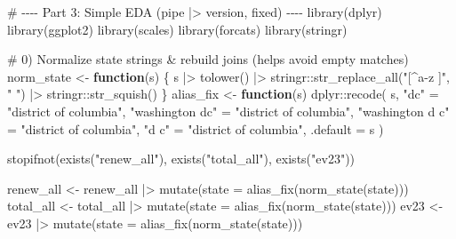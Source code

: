 \documentclass[
  english,
  letterpaper,
  DIV=11,
  numbers=noendperiod]{scrartcl}
\newenvironment{Shaded}{\begin{snugshade}}{\end{snugshade}}
\newcommand{\AttributeTok}[1]{\textcolor[rgb]{0.40,0.45,0.13}{#1}}
\newcommand{\CommentTok}[1]{\textcolor[rgb]{0.37,0.37,0.37}{#1}}
\newcommand{\ControlFlowTok}[1]{\textcolor[rgb]{0.00,0.23,0.31}{\textbf{#1}}}
\newcommand{\FunctionTok}[1]{\textcolor[rgb]{0.28,0.35,0.67}{#1}}
\newcommand{\NormalTok}[1]{\textcolor[rgb]{0.00,0.23,0.31}{#1}}
\newcommand{\OtherTok}[1]{\textcolor[rgb]{0.00,0.23,0.31}{#1}}
\newcommand{\SpecialCharTok}[1]{\textcolor[rgb]{0.37,0.37,0.37}{#1}}
\newcommand{\StringTok}[1]{\textcolor[rgb]{0.13,0.47,0.30}{#1}}
\begin{document}
\begin{Shaded}
\begin{Highlighting}[]
\CommentTok{\# {-}{-}{-}{-} Part 3: Simple EDA (pipe |\textgreater{} version, fixed) {-}{-}{-}{-}}
\FunctionTok{library}\NormalTok{(dplyr)}
\FunctionTok{library}\NormalTok{(ggplot2)}
\FunctionTok{library}\NormalTok{(scales)}
\FunctionTok{library}\NormalTok{(forcats)}
\FunctionTok{library}\NormalTok{(stringr)}

\CommentTok{\# 0) Normalize state strings \& rebuild joins (helps avoid empty matches)}
\NormalTok{norm\_state }\OtherTok{\textless{}{-}} \ControlFlowTok{function}\NormalTok{(s) \{}
\NormalTok{  s }\SpecialCharTok{|\textgreater{}}
    \FunctionTok{tolower}\NormalTok{() }\SpecialCharTok{|\textgreater{}}
\NormalTok{    stringr}\SpecialCharTok{::}\FunctionTok{str\_replace\_all}\NormalTok{(}\StringTok{"[\^{}a{-}z ]"}\NormalTok{, }\StringTok{" "}\NormalTok{) }\SpecialCharTok{|\textgreater{}}
\NormalTok{    stringr}\SpecialCharTok{::}\FunctionTok{str\_squish}\NormalTok{()}
\NormalTok{\}}
\NormalTok{alias\_fix }\OtherTok{\textless{}{-}} \ControlFlowTok{function}\NormalTok{(s) dplyr}\SpecialCharTok{::}\FunctionTok{recode}\NormalTok{(}
\NormalTok{  s,}
  \StringTok{"dc"} \OtherTok{=} \StringTok{"district of columbia"}\NormalTok{,}
  \StringTok{"washington dc"} \OtherTok{=} \StringTok{"district of columbia"}\NormalTok{,}
  \StringTok{"washington d c"} \OtherTok{=} \StringTok{"district of columbia"}\NormalTok{,}
  \StringTok{"d c"} \OtherTok{=} \StringTok{"district of columbia"}\NormalTok{,}
  \AttributeTok{.default =}\NormalTok{ s}
\NormalTok{)}

\FunctionTok{stopifnot}\NormalTok{(}\FunctionTok{exists}\NormalTok{(}\StringTok{"renew\_all"}\NormalTok{), }\FunctionTok{exists}\NormalTok{(}\StringTok{"total\_all"}\NormalTok{), }\FunctionTok{exists}\NormalTok{(}\StringTok{"ev23"}\NormalTok{))}

\NormalTok{renew\_all }\OtherTok{\textless{}{-}}\NormalTok{ renew\_all }\SpecialCharTok{|\textgreater{}} \FunctionTok{mutate}\NormalTok{(}\AttributeTok{state =} \FunctionTok{alias\_fix}\NormalTok{(}\FunctionTok{norm\_state}\NormalTok{(state)))}
\NormalTok{total\_all }\OtherTok{\textless{}{-}}\NormalTok{ total\_all }\SpecialCharTok{|\textgreater{}} \FunctionTok{mutate}\NormalTok{(}\AttributeTok{state =} \FunctionTok{alias\_fix}\NormalTok{(}\FunctionTok{norm\_state}\NormalTok{(state)))}
\NormalTok{ev23      }\OtherTok{\textless{}{-}}\NormalTok{ ev23      }\SpecialCharTok{|\textgreater{}} \FunctionTok{mutate}\NormalTok{(}\AttributeTok{state =} \FunctionTok{alias\_fix}\NormalTok{(}\FunctionTok{norm\_state}\NormalTok{(state)))}


\end{Highlighting}
\end{Shaded}
\end{document}

